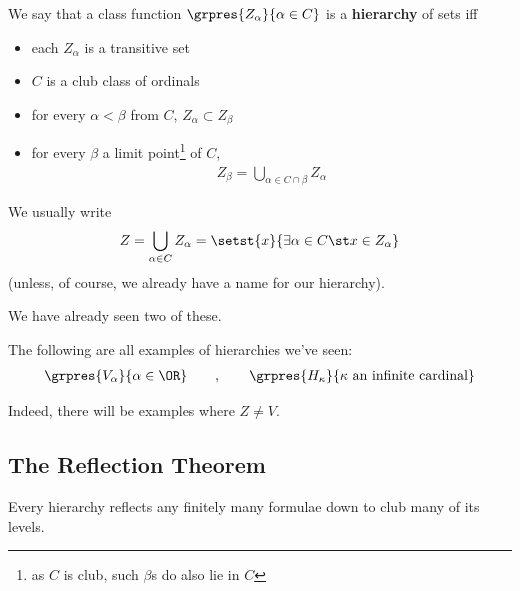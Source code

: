 \begin{boxdefinition}[Hierarchy] \label{Ch3:Def:Hierarchy}
    We say that a class function $\grpres{Z_{\alpha}}{\alpha \in C}$ is a \textbf{hierarchy} of sets iff
    \begin{itemize}
        \item each $Z_{\alpha}$ is a transitive set
        \item $C$ is a club class of ordinals
        \item for every $\alpha < \beta$ from $C$, $Z_{\alpha} \subset Z_{\beta}$
        \item for every $\beta$ a limit point\footnote{as $C$ is club, such $\beta$s do also lie in $C$} of $C$,
        \begin{align*}
            Z_{\beta} = \bigcup_{\alpha \in C \cap \beta} Z_{\alpha}
        \end{align*}
    \end{itemize}
    We usually write
    \begin{align*}
        Z = \bigcup_{\alpha \in C} Z_{\alpha}
        = \setst{x}{\exists \alpha \in C \st x \in Z_{\alpha}}
    \end{align*}
    (unless, of course, we already have a name for our hierarchy).
\end{boxdefinition}

We have already seen two of these.

\begin{boxexample}
    The following are all examples of hierarchies we've seen:
    \begin{align*}
        \grpres{V_{\alpha}}{\alpha \in \OR}
        \qquad , \qquad
        \grpres{H_{\kappa}}{\kappa \text{ an infinite cardinal}}
    \end{align*}
\end{boxexample}

Indeed, there will be examples where $Z \ne V$.

\subsection{The Reflection Theorem}

Every hierarchy reflects any finitely many formulae down to club many of its levels.

